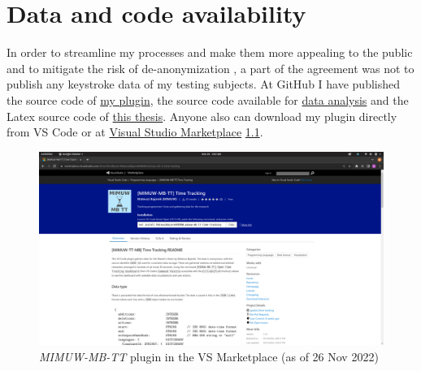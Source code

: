 \chapter{Data and code availability}
In order to streamline my processes and make them more appealing to the public and to mitigate the risk of de-anonymization \cite{Nar08DeAnon}, a part of the agreement was not to publish any keystroke data of my testing subjects. At GitHub I have published the source code of \href{https://github.com/goalon/time-tracking}{my plugin}, the source code available for \href{https://github.com/goalon/time-tracking-analysis}{data analysis} and the Latex source code of \href{https://github.com/goalon/masters-thesis}{this thesis}. Anyone also can download my plugin directly from VS Code or at \href{https://marketplace.visualstudio.com/items?itemName=MateuszBajorekMIMUW.mimuw-mb-tt-time-tracking}{Visual Studio Marketplace} \ref{fig:marketplace}.

\begin{figure}[htbp]
  \centering
  \includegraphics[scale=0.22]{chapters/availability/graphics/marketplace.png}
  \caption{\textit{MIMUW-MB-TT} plugin in the VS Marketplace (as of 26 Nov 2022)}
  \label{fig:marketplace}
\end{figure}




